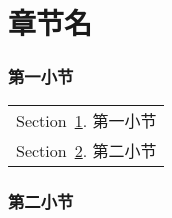 \part{章节名}\label{chap:1}

\section{第一小节}\label{sec:1.1}


\begin{margintable}\vspace{.8in}\footnotesize
    \begin{tabularx}{\marginparwidth}{|X}
        Section~\ref{sec:1.1}. 第一小节\\
        Section~\ref{sec:1.2}. 第二小节\\
    \end{tabularx}
\end{margintable}


\section{第二小节}\label{sec:1.2}